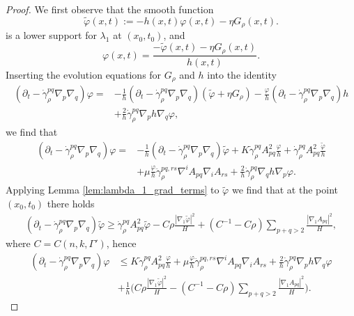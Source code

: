 \documentclass[12pt]{amsart}
\begin{document}
\begin{proof}
We first observe that the smooth function
\[\tilde \varphi(x,t) := -h(x,t) \varphi(x,t) - \eta G_\rho(x,t).\]
is a lower support for $\lambda_1$ at $(x_0,t_0)$, and
\[\varphi(x,t) = \frac{-\tilde \varphi(x,t) - \eta G_\rho(x,t)}{h(x,t)}.\]
Inserting the evolution equations for $G_\rho$ and $h$ into the identity
\begin{align*}
(\partial_t - \dot \gamma_\rho^{pq}\nabla_p \nabla_q) \varphi =& -\frac{1}{h} (\partial_t - \dot \gamma_\rho^{pq} \nabla_p \nabla_q) (\tilde \varphi+\eta G_\rho) - \frac{\varphi}{h} (\partial_t - \dot \gamma_\rho^{pq} \nabla_p \nabla_q) h\\
& + \frac{2}{h} \dot \gamma_\rho^{pq} \nabla_p h \nabla_q \varphi,
\end{align*}
we find that
\begin{align*}
(\partial_t - \dot \gamma_{\rho}^{pq} \nabla_p \nabla_q) \varphi =& -  \frac{1}{h} (\partial_t - \dot \gamma_{\rho}^{pq} \nabla_p \nabla_q) \tilde \varphi+K \dot \gamma_\rho^{pq} A^2_{pq} \frac{\varphi}{h} + \dot \gamma_\rho^{pq}A^2_{pq} \frac{\tilde \varphi}{h} \\
&  + \mu\frac{\varphi}{h} \ddot \gamma_\rho^{pq,rs}  \nabla^i A_{pq} \nabla_i A_{rs} + \frac{2}{h} \dot \gamma_\rho^{pq} \nabla_q h \nabla_p \varphi . 
\end{align*}
Applying Lemma \ref{lem:lambda_1_grad_terms} to $\tilde \varphi$ we find that at the point $(x_0,t_0)$ there holds
\begin{align*}
(\partial_t - \dot \gamma_{\rho}^{pq} \nabla_p \nabla_q) \tilde \varphi \geq \dot \gamma_\rho^{pq} A^2_{pq} \tilde \varphi  - C \rho \frac{|\nabla_1 \tilde \varphi|^2}{H}   + (C^{-1} - C \rho ) \sum_{p+q> 2} \frac{|\nabla_1 A_{pq}|^2}{H} ,
\end{align*} 
where $C = C(n,k,\Gamma')$, hence
\begin{align*}
(\partial_t - \dot \gamma_{\rho}^{pq} \nabla_p \nabla_q)\varphi & \leq K\dot \gamma_\rho^{pq} A^2_{pq}  \frac{\varphi}{h}  + \mu\frac{\varphi}{h} \ddot \gamma_\rho^{pq,rs}  \nabla^i A_{pq} \nabla_i A_{rs} + \frac{2}{h} \dot \gamma_\rho^{pq}  \nabla_p h \nabla_q \varphi\\
&+\frac{1}{h} \bigg( C \rho \frac{|\nabla_1 \tilde \varphi|^2}{H}   - (C^{-1} - C \rho ) \sum_{p+q> 2} \frac{|\nabla_1 A_{pq}|^2}{H} \bigg).
\end{align*}


\end{proof}
\end{document}
